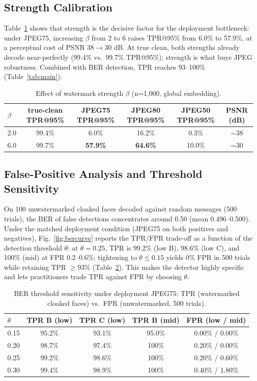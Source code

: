 \documentclass[preprint,12pt]{elsarticle}
\begin{document}
\subsection{Strength Calibration}
\label{sec:ablation}
Table~\ref{tab:strength} shows that strength is the decisive factor for the deployment bottleneck: under JPEG75, increasing $\beta$ from 2 to 6 raises TPR@95\% from 6.0\% to 57.9\%, at a perceptual cost of PSNR 38$\rightarrow$30 dB. At true clean, both strengths already decode near-perfectly (99.4\% vs.\ 99.7\% TPR@95\%); strength is what buys JPEG robustness. Combined with BER detection, TPR reaches 93--100\% (Table~\ref{tab:main}).

\begin{table}[t]
\caption{Effect of watermark strength $\beta$ (n=1,000, global embedding).}
\label{tab:strength}
\centering
\small
\begin{tabular}{lccccc}
\toprule
$\beta$ & true-clean TPR@95\% & JPEG75 TPR@95\% & JPEG80 TPR@95\% & JPEG50 TPR@95\% & PSNR (dB) \\
\midrule
2.0 & 99.4\% & 6.0\% & 16.2\% & 0.3\% & $\sim$38 \\
6.0 & 99.7\% & \textbf{57.9\%} & \textbf{64.6\%} & 10.0\% & $\sim$30 \\
\bottomrule
\end{tabular}
\end{table}

\subsection{False-Positive Analysis and Threshold Sensitivity}
On 100 unwatermarked cloaked faces decoded against random messages (500 trials), the BER of false detections concentrates around 0.50 (mean 0.496--0.500). Under the matched deployment condition (JPEG75 on both positives and negatives), Fig.~\ref{fig:bercurve} reports the TPR/FPR trade-off as a function of the detection threshold $\theta$: at $\theta=0.25$, TPR is 99.2\% (low B), 98.6\% (low C), and 100\% (mid) at FPR 0.2--0.6\%; tightening to $\theta\le0.15$ yields 0\% FPR in 500 trials while retaining TPR $\ge93\%$ (Table~\ref{tab:ber}). This makes the detector highly specific and lets practitioners trade TPR against FPR by choosing $\theta$.

\begin{table}[t]
\caption{BER threshold sensitivity under deployment JPEG75: TPR (watermarked cloaked faces) vs.\ FPR (unwatermarked, 500 trials).}
\label{tab:ber}
\centering
\small
\begin{tabular}{lcccc}
\toprule
$\theta$ & TPR B (low) & TPR C (low) & TPR B (mid) & FPR (low / mid) \\
\midrule
0.15 & 95.2\% & 93.1\% & 95.0\% & 0.00\% / 0.00\% \\
0.20 & 98.7\% & 97.4\% & 100\%  & 0.20\% / 0.00\% \\
0.25 & 99.2\% & 98.6\% & 100\%  & 0.20\% / 0.60\% \\
0.30 & 99.4\% & 98.9\% & 100\%  & 0.40\% / 1.80\% \\
\bottomrule
\end{tabular}
\end{table}
\end{document}
